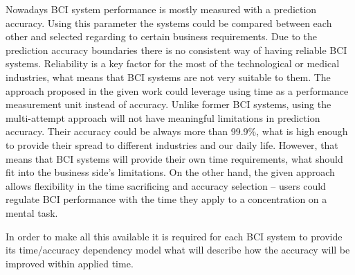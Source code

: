 \documentclass[12pt]{article}
\theoremstyle{definition}
\begin{document}
Nowadays BCI system performance is mostly measured with a prediction accuracy. Using this parameter the systems could be compared between each other and selected regarding to certain business requirements. Due to the prediction accuracy boundaries there is no consistent way of having reliable BCI systems. Reliability is a key factor for the most of the technological or medical industries, what means that BCI systems are not very suitable to them. The approach proposed in the given work could leverage using time as a performance measurement unit instead of accuracy. Unlike former BCI systems, using the multi-attempt approach will not have meaningful limitations in prediction accuracy. Their accuracy could be always more than 99.9\%, what is high enough to  provide their spread to different industries and our daily life. However, that means that BCI systems will provide their own time requirements, what should fit into the business side's limitations. On the other hand, the given approach allows flexibility in the time sacrificing and accuracy selection -- users could regulate BCI performance with the time they apply to a concentration on a mental task.

In order to make all this available it is required for each BCI system to provide its time/accuracy dependency model what will describe how the accuracy will be improved within applied time. 


\newpage




\newpage

\appendix
\end{document}
